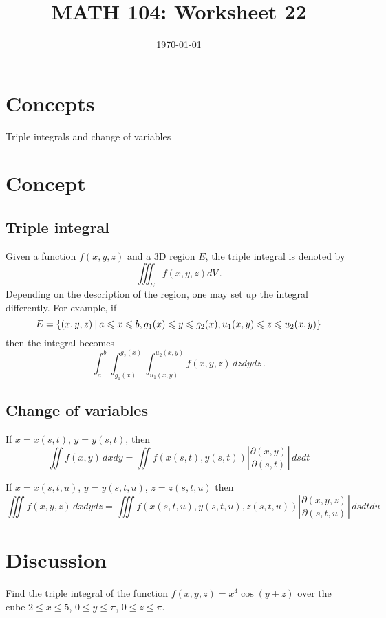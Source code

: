 \documentclass[12pt]{amsart}
\title{ MATH 104: Worksheet 22}
\author{}
\date{\today}
\begin{document}
\maketitle


\section{Concepts}

Triple integrals and change of variables

\section{Concept}

\subsection{Triple integral}
Given a function $f(x,y,z)$ and a 3D region $E$, the triple integral
is denoted by
\begin{equation*}
	\iiint_E f(x,y,z) dV \,.
\end{equation*}
Depending on the description of the region, one may set up the integral differently.
For example,
if
$$ E = \left\{ (x,y,z) \st a \leq x \leq b, g_1(x) \leq y \leq g_2(x), u_1(x,y) \leq z \leq u_2(x,y)  \right\}$$
then the integral becomes
\begin{equation*}
	\int_a^b \int_{g_1(x)}^{g_2(x)} \int_{u_1(x,y)}^{u_2(x,y)} f(x,y,z) \, dz dy dz \,.
\end{equation*}


\subsection{Change of variables}
If $x = x(s,t)$, $y = y(s,t)$, then
$$ \iint f(x,y) \, dx dy = \iint f(x(s,t), y(s,t)) \left| \frac{\partial(x,y)}{\partial(s,t)}  \right| \, ds dt $$

If $x = x(s,t,u)$, $y = y(s,t, u)$, $z = z(s,t,u)$ then
$$ \iiint f(x,y,z) \, dx dy dz = \iiint f(x(s,t,u), y(s,t,u), z(s,t,u)) \left| \frac{\partial(x,y,z)}{\partial(s,t,u)}  \right| \, ds dt du $$



\section{Discussion}

\begin{question}
	Find the triple integral of the function $f(x,y,z) = x^4 \cos (y+z)$ over the cube
	$2 \leq x \leq 5$, $0 \leq y \leq \pi$, $0 \leq z \leq \pi$.
\end{question}
\end{document}
